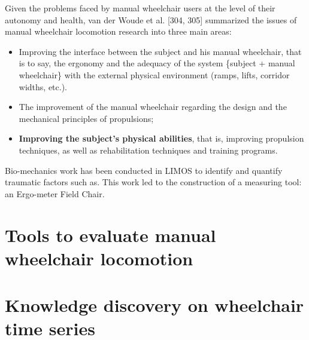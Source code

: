 Given the problems faced by manual wheelchair users at the level of
their autonomy and health, van der Woude et al. [304, 305] summarized the issues of manual wheelchair locomotion research into three main areas:

\begin{itemize}
\item Improving the interface between the subject and his manual wheelchair, that is to say, the ergonomy and the adequacy of the system \{subject + manual wheelchair\} with the external physical environment (ramps, lifts, corridor widths, etc.).
\item The improvement of the manual wheelchair regarding the design and the mechanical principles of propulsions;
\item \textbf{Improving the subject's physical abilities}, that is, improving propulsion techniques, as well as rehabilitation techniques and training programs.
\end{itemize}

Bio-mechanics work has been conducted in LIMOS to identify and quantify traumatic factors such as. This work led to the construction of a measuring tool: an Ergo-meter Field Chair.

\section{Tools to evaluate manual wheelchair locomotion}

\section{Knowledge discovery on wheelchair time series}

